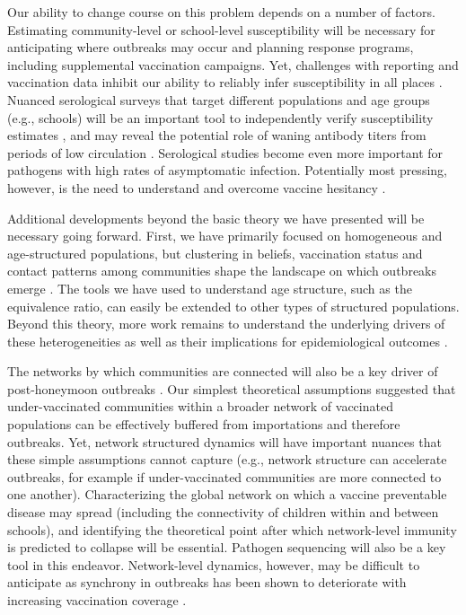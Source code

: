 Our ability to change course on this problem depends on a number of factors. Estimating community-level or school-level susceptibility will be necessary for anticipating where outbreaks may occur and planning response programs, including supplemental vaccination campaigns. Yet, challenges with reporting and vaccination data inhibit our ability to reliably infer susceptibility in all places \citep{ChenBento2026,ZhouEtAl2026,FitzpatrickEtAl2026,MastersEtAl2020,BhatiaEtAl2025}. Nuanced serological surveys that target different populations and age groups (e.g., schools) will be an important tool to independently verify susceptibility estimates \citep{LesslerEtAl2016,WinterEtAl2018,MetcalfEtAl2020}, and may reveal the potential role of waning antibody titers from periods of low circulation \citep{MenezesEtAl2025,RobertEtAl2024,OsmanEtAl2026}. Serological studies become even more important for pathogens with high rates of asymptomatic infection. Potentially most pressing, however, is the need to understand and overcome vaccine hesitancy \citep{HijanoEtAl2025,OliveEtAl2018}.

Additional developments beyond the basic theory we have presented will be necessary going forward. First, we have primarily focused on homogeneous and age-structured populations, but clustering in beliefs, vaccination status and contact patterns among communities shape the landscape on which outbreaks emerge \citep{KlinkenbergEtAl2022,ChenBento2026,MastersEtAl2020,FitzpatrickEtAl2026}. The tools we have used to understand age structure, such as the equivalence ratio, can easily be extended to other types of structured populations. Beyond this theory, more work remains to understand the underlying drivers of these heterogeneities \citep{BauchEarn2004,SalatheBonhoeffer2008,MbahEtAl2012,GarnierEtAl2020,KonstantinouEtAl2021,AlvarezZuzekEtAl2022} as well as their implications for epidemiological outcomes \citep{TrueloveEtAl2019,GromisLiu2021,HarrisEtAl2026}.

The networks by which communities are connected will also be a key driver of post-honeymoon outbreaks \citep{ColizzaEtAl2006,Riley2007}. Our simplest theoretical assumptions suggested that under-vaccinated communities within a broader network of vaccinated populations can be effectively buffered from importations and therefore outbreaks. Yet, network structured dynamics will have important nuances that these simple assumptions cannot capture (e.g., network structure can accelerate outbreaks, for example if under-vaccinated communities are more connected to one another). Characterizing the global network on which a vaccine preventable disease may spread (including the connectivity of children within and between schools), and identifying the theoretical point after which network-level immunity is predicted to collapse will be essential. Pathogen sequencing will also be a key tool in this endeavor. Network-level dynamics, however, may be difficult to anticipate as synchrony in outbreaks has been shown to deteriorate with increasing vaccination coverage \citep{LauEtAl2020}.

